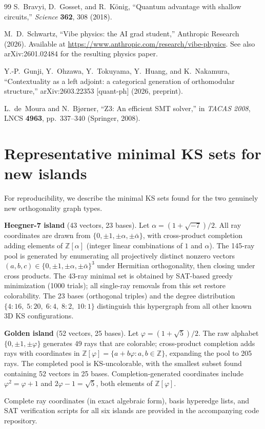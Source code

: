 \documentclass[12pt,a4paper]{article}
\newcommand{\Z}{\mathbb{Z}}
\begin{document}
\begin{thebibliography}{99}
S.~Bravyi, D.~Gosset, and R.~K\"onig,
``Quantum advantage with shallow circuits,''
\textit{Science} \textbf{362}, 308 (2018).

M.~D.~Schwartz,
``Vibe physics: the AI grad student,''
Anthropic Research (2026).
Available at \url{https://www.anthropic.com/research/vibe-physics}.
See also arXiv:2601.02484 for the resulting physics paper.

Y.-P.~Gunji, Y.~Ohzawa, Y.~Tokuyama, Y.~Huang, and K.~Nakamura,
``Contextuality as a left adjoint: a categorical generation of orthomodular structure,''
arXiv:2603.22353 [quant-ph] (2026, preprint).

L.~de~Moura and N.~Bj{\o}rner,
``Z3: An efficient SMT solver,''
in \textit{TACAS 2008}, LNCS \textbf{4963}, pp.~337--340 (Springer, 2008).

\end{thebibliography}

\appendix

\section{Representative minimal KS sets for new islands}\label{app:rays}

For reproducibility, we describe the minimal KS sets found for the two genuinely new orthogonality graph types.

\textbf{Heegner-7 island} (43 vectors, 23 bases). Let $\alpha = (1+\sqrt{-7})/2$. All ray coordinates are drawn from $\{0, \pm 1, \pm\alpha, \pm\bar\alpha\}$, with cross-product completion adding elements of $\Z[\alpha]$ (integer linear combinations of $1$ and $\alpha$). The 145-ray pool is generated by enumerating all projectively distinct nonzero vectors $(a, b, c) \in \{0, \pm 1, \pm\alpha, \pm\bar\alpha\}^3$ under Hermitian orthogonality, then closing under cross products. The 43-ray minimal set is obtained by SAT-based greedy minimization (1000 trials); all single-ray removals from this set restore colorability. The 23 bases (orthogonal triples) and the degree distribution $\{4{:}16,\; 5{:}20,\; 6{:}4,\; 8{:}2,\; 10{:}1\}$ distinguish this hypergraph from all other known 3D KS configurations.

\textbf{Golden island} (52 vectors, 25 bases). Let $\varphi = (1+\sqrt{5})/2$. The raw alphabet $\{0, \pm 1, \pm\varphi\}$ generates 49 rays that are colorable; cross-product completion adds rays with coordinates in $\Z[\varphi] = \{a + b\varphi : a, b \in \Z\}$, expanding the pool to 205 rays. The completed pool is KS-uncolorable, with the smallest subset found containing 52 vectors in 25 bases. Completion-generated coordinates include $\varphi^2 = \varphi + 1$ and $2\varphi - 1 = \sqrt{5}$, both elements of $\Z[\varphi]$.

Complete ray coordinates (in exact algebraic form), basis hyperedge lists, and SAT verification scripts for all six islands are provided in the accompanying code repository.
\end{document}
